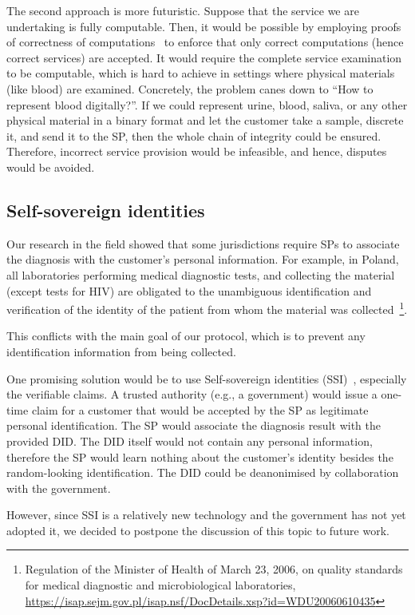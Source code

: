 The second approach is more futuristic. Suppose that the service we are undertaking is fully computable. Then, it would be possible by employing proofs of correctness of computations~\cite{ben-sassonSNARKsVerifyingProgram2013} to enforce that only correct computations (hence correct services) are accepted. It would require the complete service examination to be computable, which is hard to achieve in settings where physical materials (like blood) are examined. Concretely, the problem canes down to ``How to represent blood digitally?''. If we could represent urine, blood, saliva, or any other physical material in a binary format and let the customer take a sample, discrete it, and send it to the SP, then the whole chain of integrity could be ensured. Therefore, incorrect service provision would be infeasible, and hence, disputes would be avoided.

\subsection{Self-sovereign identities}
Our research in the field showed that some jurisdictions require SPs to associate the diagnosis with the customer's personal information. For example, in Poland, all laboratories performing medical diagnostic tests, and collecting the material (except tests for HIV) are obligated to the unambiguous identification and verification of the identity of the patient from whom the material was collected~\footnote{Regulation of the Minister of Health of March 23, 2006, on quality standards for medical diagnostic and microbiological laboratories, \url{https://isap.sejm.gov.pl/isap.nsf/DocDetails.xsp?id=WDU20060610435}}.

This conflicts with the main goal of our protocol, which is to prevent any identification information from being collected.

One promising solution would be to use Self-sovereign identities (SSI)~\cite{muhleSurveyEssentialComponents2018}, especially the verifiable claims. A trusted authority (e.g., a government) would issue a one-time claim for a customer that would be accepted by the SP as legitimate personal identification. The SP would associate the diagnosis result with the provided DID. The DID itself would not contain any personal information, therefore the SP would learn nothing about the customer's identity besides the random-looking identification. The DID could be deanonimised by collaboration with the government.

However, since SSI is a relatively new technology and the government has not yet adopted it, we decided to postpone the discussion of this topic to future work.

